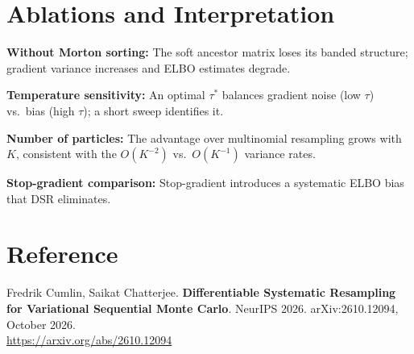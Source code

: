 \documentclass[10pt,twocolumn]{article}
\begin{document}
\section{Ablations and Interpretation}

\textbf{Without Morton sorting:} The soft ancestor matrix loses its banded
structure; gradient variance increases and ELBO estimates degrade.

\textbf{Temperature sensitivity:} An optimal $\tau^*$ balances gradient
noise (low $\tau$) vs.\ bias (high $\tau$); a short sweep identifies it.

\textbf{Number of particles:} The advantage over multinomial resampling
grows with $K$, consistent with the $O(K^{-2})$ vs.\ $O(K^{-1})$ variance
rates.

\textbf{Stop-gradient comparison:} Stop-gradient introduces a systematic
ELBO bias that DSR eliminates.

\section*{Reference}

Fredrik Cumlin, Saikat Chatterjee.
\textbf{Differentiable Systematic Resampling for Variational Sequential Monte Carlo}.
NeurIPS 2026. arXiv:2610.12094, October 2026.\\
\url{https://arxiv.org/abs/2610.12094}
\end{document}
